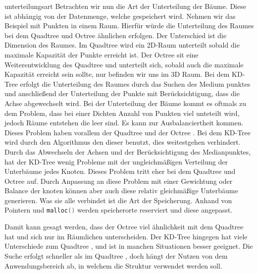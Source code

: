 \documentclass[11pt]{article}
\newcommand{\qt}{Quadtree }
\newcommand{\oc}{Octree }
\newcommand{\kd}{KD-Tree }
\newcommand{\lstin}[1]{\lstinline[language=C]{#1}}
\begin{document}
unterteilungsart
Betrachten wir nun die Art der Unterteilung der Bäume. Diese ist abhängig von der Datenmenge, welche gespeichert wird. Nehmen wir das Beispiel mit Punkten in einem Raum. Hierfür würde die Unterteilung des Raumes bei dem \qt und \oc ähnlichen erfolgen. 
Der Unterschied ist die Dimension des Raumes. Im \qt wird ein 2D-Raum unterteilt sobald die maximale Kapazität der Punkte erreicht ist. Der \oc sit eine Weiterentwicklung des \qt und unterteilt sich, sobald auch die maximale Kapazität erreicht sein sollte, nur befinden wir uns im 3D Raum. 
Bei dem \kd erfolgt die Unterteilung des Raumes durch das Suchen des Medium punktes und anschließend der Unterteilung der Punkte mit Berücksichtigung, dass die Achse abgewechselt wird.  \newline
Bei der Unterteilung der Bäume kommt es oftmals zu dem Problem, dass bei einer Dichten Anzahl von Punkten viel unteteilt wird, jedoch Räume entstehen die leer sind. Es kann zur Ausbalanciertheit kommen.
Dieses Problem haben vorallem der \qt und der \oc. Bei dem \kd wird durch den Algorithmus den dieser benutzt, dies weitestgehen verhindert. \newline 
Durch das Abwechseln der Achsen und der Berücksichtigung des Medianpunktes, hat der \kd wenig Probleme mit der ungleichmäßigen Verteilung der Unterbäume jedes Knoten. Dieses Problem tritt eher bei dem \qt und \oc auf. Durch Anpassung an diese Problem mit einer Gewichtung oder Balance der knoten können aber auch diese relativ gleichmäßige Unterbäume generieren.\newline
Was sie alle verbindet ist die Art der Speicherung. Anhand von Pointern und \lstin{malloc()} werden speicherorte reserviert und diese angepasst. 

Damit kann gesagt werden, dass der \oc viel ähnlichkeit mit dem \qt hat und sich nur im Räumlichen unterscheiden. Der \kd hingegen hat viele Unterschiede zum \qt, und ist in manchen Situationen besser geeignet. Die Suche erfolgt schneller als im \qt , doch hängt der Nutzen von dem Anwendungsbereich ab, in welchem die Struktur verwendet werden soll. 


\pagebreak


\end{document}
